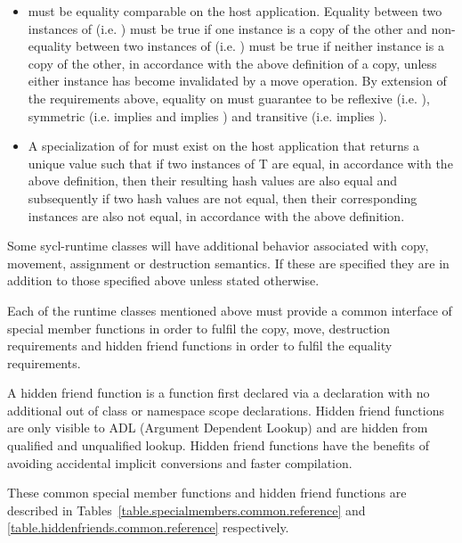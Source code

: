 \begin{itemize}
\item {} must be equality comparable on the host application. Equality between two instances of  (i.e. ) must be true if one instance is a copy of the other and non-equality between two instances of  (i.e. ) must be true if neither instance is a copy of the other, in accordance with the above definition of a copy, unless either instance has become invalidated by a move operation. By extension of the requirements above, equality on  must guarantee to be reflexive (i.e. ), symmetric (i.e.  implies  and  implies ) and transitive (i.e.  implies ).

\item A specialization of  for  must exist on the host application that returns a unique value such that if two instances of T are equal, in accordance with the above definition, then their resulting hash values are also equal and subsequently if two hash values are not equal, then their corresponding instances are also not equal, in accordance with the above definition.

\end{itemize}

Some \gls{sycl-runtime} classes will have additional behavior associated with copy, movement, assignment or destruction semantics. If these are specified they are in addition to those specified above unless stated otherwise.

Each of the runtime classes mentioned above must provide a common interface of special member functions in order to fulfil the copy, move, destruction requirements and hidden friend functions in order to fulfil the equality requirements.

A hidden friend function is a function first declared via a  declaration with no additional out of class or namespace scope declarations.  Hidden friend functions are only visible to ADL (Argument Dependent Lookup) and are hidden from qualified and unqualified lookup.  Hidden friend functions have the benefits of avoiding accidental implicit conversions and faster compilation.

These common special member functions and hidden friend functions are described in Tables~\ref{table.specialmembers.common.reference} and \ref{table.hiddenfriends.common.reference} respectively.

